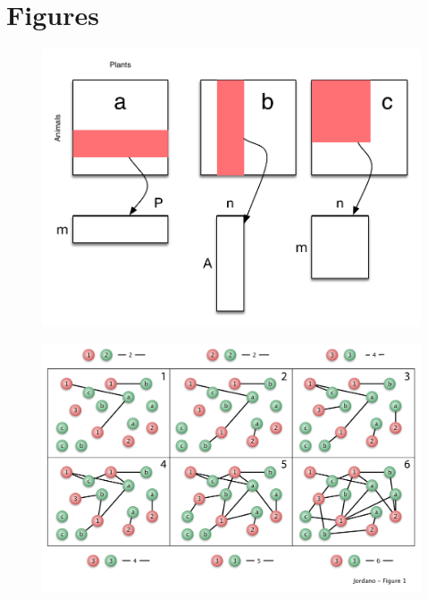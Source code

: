 \documentclass[12pt]{article}
\begin{document}
\section*{Figures}
\begin{figure}[htb!]
  \caption{}
  \label{Fig1}
  \begin{center}
    \includegraphics[width=17cm]{../figures/Fig1.pdf}
  \end{center}
\end{figure}
\newpage
\begin{figure}[htb!]
  \caption{}
  \label{Fig2}
  \begin{center}
    \includegraphics[width=17cm]{../figures/Fig2.pdf}
  \end{center}
\end{figure}
\newpage
\end{document}
